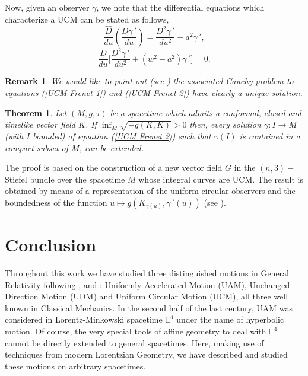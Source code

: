 \documentclass[11pt]{book}
\newtheorem{theor}[defi]{Theorem}
\newtheorem{rem}[defi]{Remark}
\def\L{\mathbb L}
\begin{document}
Now, given an observer $\gamma$, we note that the differential equations which characterize a UCM can be stated as follows,
\begin{equation}\label{UCM Frenet 1}
	\dfrac{\widehat{D}}{du}\left(\dfrac{D\gamma{\,'}}{du}\right) = \frac{D^2 \gamma\,'}{du^2} - a^2 \gamma\,',
\end{equation}
\begin{equation}\label{UCM Frenet 2}
	\frac{D}{du}\Big[ \frac{D^2 \gamma\,'}{du^2} + (w^2 - a^2) \gamma\,' \Big]=0.
\end{equation}

\begin{rem}
	{\rm We would like to point out (see \cite{UCM}) the associated Cauchy problem to equations {\rm (\ref{UCM Frenet 1}) and (\ref{UCM Frenet 2})} have clearly a unique solution. 
	}
\end{rem}

\begin{theor}
	Let $(M,g,\tau)$ be a spacetime which admits a conformal, closed and timelike vector field $K$. If $\inf_M\sqrt{-g(K,K)}>0$ then, every solution $\gamma:I\to M$ (with $I$ bounded) of equation {\rm (\ref{UCM Frenet 2})} such that $\gamma(I)$ is contained in a compact subset of $M$, can be extended.
\end{theor}
The proof is based on the construction of a new vector field $G$ in the $(n,3)-$Stiefel bundle over the spacetime $M$ whose integral curves are UCM. The result is obtained by means of a representation of the uniform circular observers and the boundedness of the function $u\longmapsto g(K_{\gamma(u)}, \gamma{\,'}(u))$ (see \cite{UCM}).

\chapter*{Conclusion}
Throughout this work we have studied three distinguished motions in General Relativity following \cite{UAM}, \cite{UDM} and \cite{UCM}: Uniformly Accelerated Motion (UAM), Unchanged Direction Motion (UDM) and Uniform Circular Motion (UCM), all three well known in Classical Mechanics. In the second half of the last century, UAM was considered in Lorentz-Minkowski spacetime $\L^4$ under the name of hyperbolic motion. Of course, the very special tools of affine geometry to deal with $\L^4$ cannot be directly extended to general spacetimes. Here, making use of techniques from modern Lorentzian Geometry, we have described and studied these motions on arbitrary spacetimes. 
\end{document}
